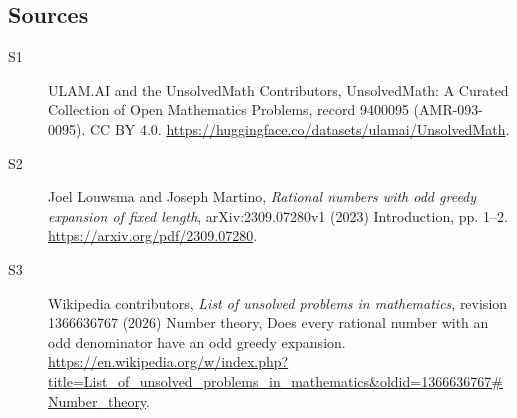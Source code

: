 \documentclass[11pt]{article}
\begin{document}
\subsection{Sources}
\begin{description}
\item[\hypertarget{source:9400095:1}{S1}] ULAM.AI and the UnsolvedMath Contributors, UnsolvedMath: A Curated Collection of Open Mathematics Problems, record 9400095 (AMR-093-0095). CC BY 4.0. \url{https://huggingface.co/datasets/ulamai/UnsolvedMath}.
\item[\hypertarget{source:9400095:2}{S2}] Joel Louwsma and Joseph Martino, \emph{Rational numbers with odd greedy expansion of fixed length}, arXiv:2309.07280v1 (2023) Introduction, pp. 1--2. \url{https://arxiv.org/pdf/2309.07280}.
\item[\hypertarget{source:9400095:3}{S3}] Wikipedia contributors, \emph{List of unsolved problems in mathematics}, revision 1366636767 (2026) Number theory, Does every rational number with an odd denominator have an odd greedy expansion. \url{https://en.wikipedia.org/w/index.php?title=List_of_unsolved_problems_in_mathematics&oldid=1366636767#Number_theory}.
\end{description}
\label{end:9400095}
\end{document}
